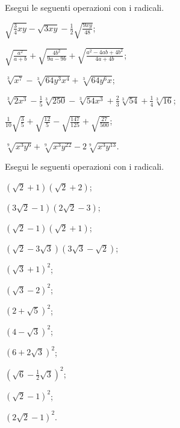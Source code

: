 \begin{esercizio}[\Ast]
 \label{ese:2.68}
Esegui le seguenti operazioni con i radicali.
 \begin{enumeratea}
 \item $\sqrt{\frac{3}{4}xy}-\sqrt{3xy}-\frac{1}{2}\sqrt{\frac{9xy}{48}}$;
 \item $\sqrt{\frac{a^{2}}{a+b}}+\sqrt{\frac{4b^{2}}{9a-9b}}+\sqrt{\frac{a^{2}-4ab+4b^{2}}{4a+4b}}$;
 \item $\sqrt[3]{x^{7}}-\sqrt[3]{64y^{3}x^{4}}+\sqrt[3]{64y^{6}x}$;
 \item $\sqrt[3]{2x^{3}}-\frac{1}{5}\sqrt[3]{250}-\sqrt[3]{54x^{3}}+\frac{2}{3}\sqrt[3]{54}+\frac{1}{4}\sqrt[3]{16}$;
 \item $\frac{1}{10}\sqrt{\frac{3}{5}}+\sqrt{\frac{12}{5}}-\sqrt{\frac{147}{125}}+\sqrt{\frac{27}{500}}$;
 \item $\sqrt[9]{x^{3}y^{6}}+\sqrt[9]{x^{3}y^{22}}-2\sqrt[9]{x^{3}y^{13}}$.
 \end{enumeratea}
\end{esercizio}

\begin{esercizio}[\Ast]
 \label{ese:2.69}
Esegui le seguenti operazioni con i radicali.
 \begin{multicols}{3}
 \begin{enumeratea}
 \item $(\sqrt 2+1)(\sqrt 2+2)$;
 \item $(3\sqrt 2-1)(2\sqrt 2-3)$;
 \item $(\sqrt 2-1)(\sqrt 2+1)$;
 \item $(\sqrt 2-3\sqrt 3)(3\sqrt 3-\sqrt 2)$;
 \item $(\sqrt 3+1)^2$;
 \item $(\sqrt 3-2)^2$;
 \item $(2+\sqrt 5)^2$;
 \item $(4-\sqrt 3)^2$;
 \item $(6+2\sqrt 3)^2$;
 \item $(\sqrt 6-\frac 1 2\sqrt 3)^2$;
 \item $(\sqrt 2-1)^2$;
 \item $(2\sqrt 2-1)^2$.
 \end{enumeratea}
 \end{multicols}
\end{esercizio}

